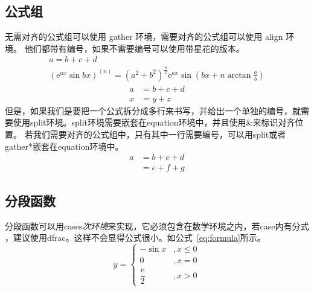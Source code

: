 \subsection{公式组}
无需对齐的公式组可以使用 gather 环境，需要对齐的公式组可以使用 align 环境。
他们都带有编号，如果不需要编号可以使用带星花的版本。
\begin{gather}
    a = b+c+d \\
    (\mathrm{e}^{ax}\sin bx)^{(n)}=(a^2+b^2)^{\frac{n}{2}}\mathrm{e}^{ax}\sin (bx+n\arctan\frac{a}{b})
\end{gather}
\begin{align*}
    a &= b+c+d \\
    x &= y+z
\end{align*}
但是，如果我们是要把一个公式拆分成多行来书写，并给出一个单独的编号，就需要使用split环境。split环境需要嵌套在equation环境中，并且使用\&来标识对齐位置。
若我们需要对齐的公式组中，只有其中一行需要编号，可以用split或者gather*嵌套在equation环境中。
\begin{equation}
    \begin{split}
        a &= b+c+d \\
          &= e+f+g
    \end{split}
\end{equation}
\subsection{分段函数}
分段函数可以用cases\textit{次环境}来实现，它必须包含在数学环境之内，若case内有分式
，建议使用dfrac。这样不会显得公式很小。如公式~\ref{eq:formula}所示。
\begin{equation}
    \label{eq:formula}
    y=
    \begin{cases}
        -\sin{x}                &,x \leqslant 0 \\
        0                       &,x=0 \\
        \dfrac{\mathrm{e}}{2}    &,x>0
    \end{cases} 
\end{equation}